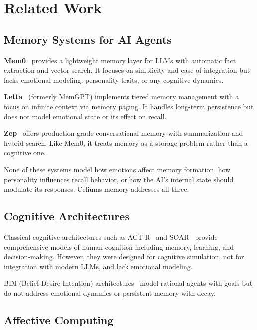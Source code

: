 \documentclass[journal,twoside]{IEEEtran}
\begin{document}
\section{Related Work}

\subsection{Memory Systems for AI Agents}

\textbf{Mem0}~\cite{mem0} provides a lightweight memory layer for LLMs with automatic fact extraction and vector search. It focuses on simplicity and ease of integration but lacks emotional modeling, personality traits, or any cognitive dynamics.

\textbf{Letta}~\cite{letta} (formerly MemGPT) implements tiered memory management with a focus on infinite context via memory paging. It handles long-term persistence but does not model emotional state or its effect on recall.

\textbf{Zep}~\cite{zep} offers production-grade conversational memory with summarization and hybrid search. Like Mem0, it treats memory as a storage problem rather than a cognitive one.

None of these systems model how emotions affect memory formation, how personality influences recall behavior, or how the AI's internal state should modulate its responses. Celiums-memory addresses all three.

\subsection{Cognitive Architectures}

Classical cognitive architectures such as ACT-R~\cite{anderson2004, anderson2013} and SOAR~\cite{laird2012} provide comprehensive models of human cognition including memory, learning, and decision-making. However, they were designed for cognitive simulation, not for integration with modern LLMs, and lack emotional modeling.

BDI (Belief-Desire-Intention) architectures~\cite{bratman1987} model rational agents with goals but do not address emotional dynamics or persistent memory with decay.

\subsection{Affective Computing}
\end{document}
